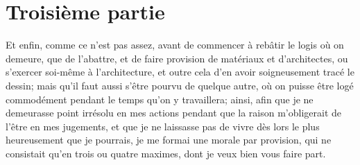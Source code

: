 \documentclass[french,twoside]{book} %
\newcommand\chapteropen{} %
\newcommand\chaptercont{} %
\begin{document}
\chapteropen
\renewcommand{\leftmark}{Troisième partie}
\chapter[Troisième partie]{Troisième partie}

\chaptercont
\noindent Et enfin, comme ce n'est pas assez, avant de commencer à rebâtir le logis où on demeure, que de l'abattre, et de faire provision de matériaux et d'architectes, ou s'exercer soi-même à l'architecture, et outre cela d'en avoir soigneusement tracé le dessin; mais qu'il faut aussi s'être pourvu de quelque autre, où on puisse être logé commodément pendant le temps qu'on y travaillera; ainsi, afin que je ne demeurasse point irrésolu en mes actions pendant que la raison m'obligerait de l'être en mes jugements, et que je ne laissasse pas de vivre dès lors le plus heureusement que je pourrais, je me formai une morale par provision, qui ne consistait qu'en trois ou quatre maximes, dont je veux bien vous faire part.\par
\end{document}
